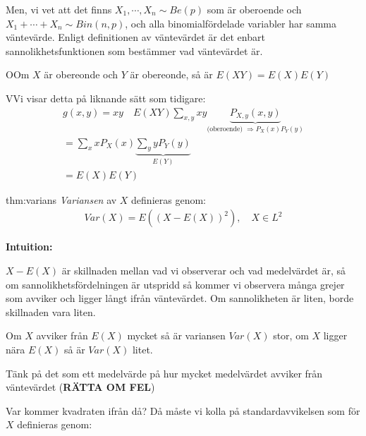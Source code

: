 \par\bigskip
\noindent Men, vi vet att det finns $X_1,\cdots, X_n\sim Be(p)$ som är oberoende och $X_1+\cdots+X_n\sim Bin(n,p)$, och alla binomialfördelade variabler har samma väntevärde. Enligt definitionen av väntevärdet är det enbart sannolikhetsfunktionen som bestämmer vad väntevärdet är.
\par\bigskip
\begin{theo}
  OOm $X$ är obereonde och $Y$ är obereonde, så är $E(XY) = E(X)E(Y)$
\end{theo}
\par\bigskip
\begin{prf}
  VVi visar detta på liknande sätt som tidigare:
  \begin{equation*}
    \begin{gathered}
      g(x,y) = xy\quad E(XY)\sum_{x,y}xy\underbrace{P_{X,y}(x,y)}_{\text{(oberoende) $\Rightarrow P_X(x)P_Y(y)$}}\\
      =\sum_xxP_X(x)\underbrace{\sum_yyP_Y(y)}_{\text{$E(Y)$}}\\
      = E(X)E(Y)
    \end{gathered}
  \end{equation*}
\end{prf}
\par\bigskip
\begin{theo}[Varians]{thm:varians}
  \textit{Variansen} av $X$ definieras genom:
  \begin{equation*}
    \begin{gathered}
      Var(X) = E((X-E(X))^2),\quad X\in L^2
    \end{gathered}
  \end{equation*}
\end{theo}
\par\bigskip
\noindent\textbf{Intuition:} \par
\noindent $X-E(X)$ är skillnaden mellan vad vi observerar och vad medelvärdet är, så om sannolikhetsfördelningen är utspridd så kommer vi observera många grejer som avviker och ligger långt ifrån väntevärdet. Om sannolikheten är liten, borde skillnaden vara liten.\par
\noindent Om $X$ avviker från $E(X)$ mycket så är variansen $Var(X)$ stor, om $X$ ligger nära $E(X)$ så är $Var(X)$ litet.
\par\bigskip
\noindent Tänk på det som ett medelvärde på hur mycket medelvärdet avviker från väntevärdet (\textbf{RÄTTA OM FEL})
\par\bigskip
\noindent Var kommer kvadraten ifrån då? Då måste vi kolla på standardavvikelsen som för $X$ definieras genom:

